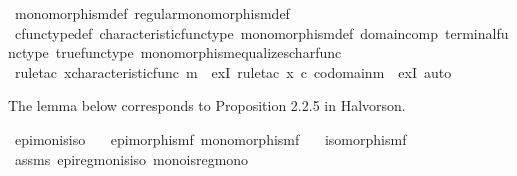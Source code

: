 \begin{isabellebody}
%
\isatagproof
{}\isamarkupfalse%
\ monomorphism{\isacharunderscore}{\kern0pt}def\ regular{\isacharunderscore}{\kern0pt}monomorphism{\isacharunderscore}{\kern0pt}def\isanewline
\ \ \isamarkupfalse%
\ cfunc{\isacharunderscore}{\kern0pt}type{\isacharunderscore}{\kern0pt}def\ characteristic{\isacharunderscore}{\kern0pt}func{\isacharunderscore}{\kern0pt}type\ monomorphism{\isacharunderscore}{\kern0pt}def\ domain{\isacharunderscore}{\kern0pt}comp\ terminal{\isacharunderscore}{\kern0pt}func{\isacharunderscore}{\kern0pt}type\ true{\isacharunderscore}{\kern0pt}func{\isacharunderscore}{\kern0pt}type\ monomorphism{\isacharunderscore}{\kern0pt}equalizes{\isacharunderscore}{\kern0pt}char{\isacharunderscore}{\kern0pt}func\isanewline
\ \ \isamarkupfalse%
\ {\isacharparenleft}{\kern0pt}rule{\isacharunderscore}{\kern0pt}tac\ x{\isacharequal}{\kern0pt}{\isachardoublequoteopen}characteristic{\isacharunderscore}{\kern0pt}func\ m{\isachardoublequoteclose}\ \ exI{\isacharcomma}{\kern0pt}\ rule{\isacharunderscore}{\kern0pt}tac\ x{\isacharequal}{\kern0pt}{\isachardoublequoteopen}{\isasymt}\ {\isasymcirc}\isactrlsub c\ {\isasymbeta}\isactrlbsub codomain{\isacharparenleft}{\kern0pt}m{\isacharparenright}{\kern0pt}\isactrlesub {\isachardoublequoteclose}\ \ exI{\isacharcomma}{\kern0pt}\ auto{\isacharparenright}{\kern0pt}%
\endisatagproof
{\isafoldproof}%
%
\isadelimproof
%
\endisadelimproof
%
\begin{isamarkuptext}%
The lemma below corresponds to Proposition 2.2.5 in Halvorson.%
\end{isamarkuptext}\isamarkuptrue%
\isamarkupfalse%
\ epi{\isacharunderscore}{\kern0pt}mon{\isacharunderscore}{\kern0pt}is{\isacharunderscore}{\kern0pt}iso{\isacharcolon}{\kern0pt}\isanewline
\ \ \ {\isachardoublequoteopen}epimorphism{\isacharparenleft}{\kern0pt}f{\isacharparenright}{\kern0pt}{\isachardoublequoteclose}\ {\isachardoublequoteopen}monomorphism{\isacharparenleft}{\kern0pt}f{\isacharparenright}{\kern0pt}{\isachardoublequoteclose}\isanewline
\ \ \ {\isachardoublequoteopen}isomorphism{\isacharparenleft}{\kern0pt}f{\isacharparenright}{\kern0pt}{\isachardoublequoteclose}\isanewline
%
\isadelimproof
\ \ %
\endisadelimproof
%
\isatagproof
{}\isamarkupfalse%
\ assms\ epi{\isacharunderscore}{\kern0pt}regmon{\isacharunderscore}{\kern0pt}is{\isacharunderscore}{\kern0pt}iso\ mono{\isacharunderscore}{\kern0pt}is{\isacharunderscore}{\kern0pt}regmono\ \isamarkupfalse%

\end{isabellebody}
